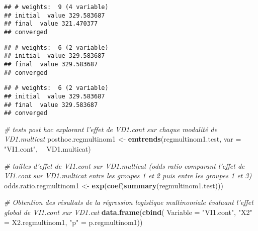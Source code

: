 \documentclass[
]{book}
\newenvironment{Shaded}{\begin{snugshade}}{\end{snugshade}}
\newcommand{\CommentTok}[1]{\textcolor[rgb]{0.56,0.35,0.01}{\textit{#1}}}
\newcommand{\DataTypeTok}[1]{\textcolor[rgb]{0.13,0.29,0.53}{#1}}
\newcommand{\KeywordTok}[1]{\textcolor[rgb]{0.13,0.29,0.53}{\textbf{#1}}}
\newcommand{\NormalTok}[1]{#1}
\newcommand{\OperatorTok}[1]{\textcolor[rgb]{0.81,0.36,0.00}{\textbf{#1}}}
\newcommand{\StringTok}[1]{\textcolor[rgb]{0.31,0.60,0.02}{#1}}
\begin{document}
\begin{verbatim}
## # weights:  9 (4 variable)
## initial  value 329.583687 
## final  value 321.470377 
## converged
\end{verbatim}

\begin{Shaded}
\end{Shaded}

\begin{verbatim}
## # weights:  6 (2 variable)
## initial  value 329.583687 
## final  value 329.583687 
## converged
\end{verbatim}

\begin{Shaded}
\end{Shaded}

\begin{verbatim}
## # weights:  6 (2 variable)
## initial  value 329.583687 
## final  value 329.583687 
## converged
\end{verbatim}

\begin{Shaded}
\begin{Highlighting}[]
\CommentTok{# tests post hoc explorant l'effet de VD1.cont sur chaque modalité de VD1.multicat}
\NormalTok{posthoc.regmultinom1 <-}\StringTok{ }\KeywordTok{emtrends}\NormalTok{(regmultinom1.test, }
                                 \DataTypeTok{var =} \StringTok{"VI1.cont"}\NormalTok{, }\OperatorTok{~}\StringTok{ }\NormalTok{VD1.multicat)}


\CommentTok{# tailles d'effet de VI1.cont sur VD1.multicat (odds ratio comparant l'effet de VI1.cont sur VD1.multicat entre les groupes 1 et 2 puis entre les groupes 1 et 3)}
\NormalTok{odds.ratio.regmultinom1 <-}\StringTok{ }\KeywordTok{exp}\NormalTok{(}\KeywordTok{coef}\NormalTok{(}\KeywordTok{summary}\NormalTok{(regmultinom1.test)))}

\CommentTok{# Obtention des résultats de la régression logistique multinomiale évaluant l'effet global de VI1.cont sur VD1.cat }
\KeywordTok{data.frame}\NormalTok{(}\KeywordTok{cbind}\NormalTok{(}
  \DataTypeTok{Variable =} \StringTok{"VI1.cont"}\NormalTok{, }
  \StringTok{"X2"}\NormalTok{ =}\StringTok{ }\NormalTok{X2.regmultinom1,}
  \StringTok{"p"}\NormalTok{ =}\StringTok{ }\NormalTok{p.regmultinom1))}
\end{Highlighting}
\end{Shaded}
\end{document}
